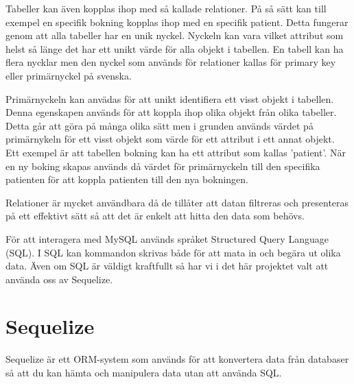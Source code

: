 Tabeller kan även kopplas ihop med så kallade relationer. På så sätt kan till exempel en specifik bokning kopplas ihop med en specifik patient. Detta fungerar genom att alla tabeller har en unik nyckel. Nyckeln kan vara vilket attribut som helst så länge det har ett unikt värde för alla objekt i tabellen. En tabell kan ha flera nycklar men den nyckel som används för relationer kallas för primary key eller primärnyckel på svenska. 

Primärnyckeln kan anvädas för att unikt identifiera ett visst objekt i tabellen. Denna egenskapen används för att koppla ihop olika objekt från olika tabeller. Detta går att göra på många olika sätt men i grunden används värdet på primärnykeln för ett visst objekt som värde för ett attribut i ett annat objekt. Ett exempel är att tabellen bokning kan ha ett attribut som kallas 'patient'. När en ny boking skapas används då värdet för primärnyckeln till den specifika patienten för att koppla patienten till den nya bokningen.

Relationer är mycket användbara då de tillåter att datan filtreras och presenteras på ett effektivt sätt så att det är enkelt att hitta den data som behövs.

För att interagera med MySQL används språket Structured Query Language (SQL). I SQL kan kommandon skrivas både för att mata in och begära ut olika data. Även om SQL är väldigt kraftfullt så har vi i det här projektet valt att använda oss av Sequelize.


\section{Sequelize}
Sequelize är ett ORM-system som används för att konvertera data från databaser så att du kan hämta och manipulera data utan att använda SQL.
\cite{sequelize}
